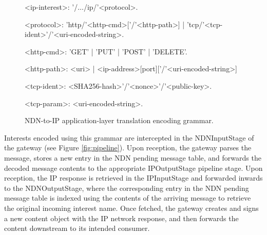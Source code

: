 \begin{figure}
\begin{mdframed}
\begingrammar
\noindent

<ip-interest>:	'/$\dots$/ip/'<protocol>.

<protocol>:	'http/'<http-cmd>[{'/'<http-path>}] | 'tcp/'<tcp-ident>'/'<uri-encoded-string>. 

<http-cmd>: 'GET' | 'PUT' | 'POST' | 'DELETE'.


<http-path>: <uri> | <ip-address>[port]['/'<uri-encoded-string>]

<tcp-ident>: <SHA256-hash>'/'<nonce>'/'<public-key>. %

<tcp-param>: <uri-encoded-string>.



		
\endgrammar
\end{mdframed}
\caption{NDN-to-IP application-layer translation encoding grammar.}
\end{figure}

Interests encoded using this grammar are intercepted in the NDNInputStage of the gateway (see Figure \ref{fig:pipeline}). Upon reception, the gateway parses the message, stores a new entry in the NDN pending message table, and forwards the decoded message contents to the appropriate IPOutputStage pipeline stage. Upon reception, the IP response is retrieved in the IPInputStage and forwarded inwards to the NDNOutputStage, where the corresponding entry in the NDN pending message table is indexed using the contents of the arriving message to retrieve the original incoming interest name. Once fetched, the gateway creates and signs a new content object with the IP network response, and then forwards the content downstream to its intended consumer. 

